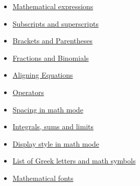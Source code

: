 \begin{itemize}
    \item \href{https://www.overleaf.com/learn/latex/Mathematical_expressions}{Mathematical expressions}
    \item \href{https://www.overleaf.com/learn/latex/Subscripts_and_superscripts}{Subscripts and superscripts}
    \item \href{https://www.overleaf.com/learn/latex/Brackets_and_Parentheses}{Brackets and Parentheses}
    \item \href{https://www.overleaf.com/learn/latex/Fractions_and_Binomials}{Fractions and Binomials}
    \item \href{https://www.overleaf.com/learn/latex/Aligning_equations_with_amsmath}{Aligning Equations}
    \item \href{https://www.overleaf.com/learn/latex/Operators}{Operators}
    \item \href{https://www.overleaf.com/learn/latex/Spacing_in_math_mode}{Spacing in math mode}
    \item \href{https://www.overleaf.com/learn/latex/Integrals%2C_sums_and_limits}{Integrals, sums and limits}
    \item \href{https://www.overleaf.com/learn/latex/Display_style_in_math_mode}{Display style in math mode}
    \item \href{https://www.overleaf.com/learn/latex/List_of_Greek_letters_and_math_symbols}{List of Greek letters and math symbols}
    \item \href{https://www.overleaf.com/learn/latex/Mathematical_fonts}{Mathematical fonts}
\end{itemize}